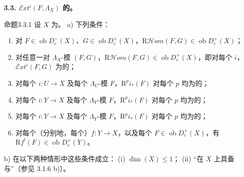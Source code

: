 \textbf{3.3. $\mathscr Ext^i(F,\Lambda_X)$ 的。}
\begin{SGAresult}{命题}{3.3.1}
设 $X$ 为。
a) 下列条件：
\begin{enumerate}
\item[(i)] 对 $F\in\operatorname{ob}D_c^-(X)$、$G\in\operatorname{ob}D_c^+(X)$，$\mathrm R\mathscr Hom(F,G)\in\operatorname{ob}D_c^+(X)$；
\item[(i bis)] 对任意一对 $\Lambda_X$-模 $(F,G)$，$\mathrm R\mathscr Hom(F,G)\in\operatorname{ob}D_c^+(X)$，即对每个 $i$，$\mathscr Ext^i(F,G)$ 为的；
\item[(ii)] 对每个 $i:U\to X$ 及每个 $\Lambda_U$-模 $F$，$\mathrm R^pi_*(F)$ 对每个 $p$ 均为的；
\item[(ii bis)] 对每个 $i:Y\to X$ 及每个 $\Lambda_Y$-模 $F$，$\mathrm R^pi_*(F)$ 对每个 $p$ 均为的；
\item[(ii ter)] 对每个 $i:Y\to X$ 及每个 $\Lambda_Y$-模 $F$，$\mathrm R^pi_*(F)$ 对每个 $p$ 均为的；
\item[(iii)] 对每个（分别地，每个）$f:Y\to X$，以及每个 $F\in\operatorname{ob}D_c^+(X)$，有 $\mathrm Rf^!(F)\in\operatorname{ob}D_c^+(Y)$。
\end{enumerate}
b) 在以下两种情形中这些条件成立：
(i) $\dim(X)\leq1$；
(ii) “在 $X$ 上具备与”（参见 3.1.6 b)）。
\end{SGAresult}
